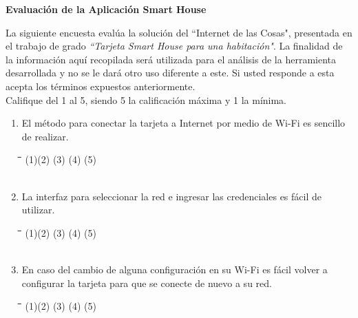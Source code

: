 \documentclass[]{proc}
\begin{document}
	
\textbf{Evaluación de la Aplicación Smart House\\}

La siguiente encuesta evalúa la solución del ``Internet de las Cosas", presentada en el trabajo de grado \textit{``Tarjeta Smart House para una habitación"}. La finalidad de la información aquí recopilada será utilizada para el análisis de la herramienta desarrollada y no se le dará otro uso diferente a este. Si usted responde a esta acepta los términos expuestos anteriormente.\\

Califique del 1 al 5, siendo 5 la calificación máxima y 1 la mínima.\\

\begin{enumerate}
	\item El método para conectar la tarjeta a Internet por medio de Wi-Fi es sencillo de realizar.
	
	\begin{tabbing}
		\hspace{1cm}\=\hspace{1cm}\=\hspace{1cm}\=\hspace{1cm}\=\kill
		(1)\>(2)  \>(3)  \>(4)  \>(5)\\\\
	\end{tabbing}
	
	\item La interfaz para seleccionar la red e ingresar las credenciales es fácil de utilizar. 
	
	\begin{tabbing}
		\hspace{1cm}\=\hspace{1cm}\=\hspace{1cm}\=\hspace{1cm}\=\kill
		(1)\>(2)  \>(3)  \>(4)  \>(5) \\\\
	\end{tabbing} 
	
	\item En caso del cambio de alguna configuración en su Wi-Fi es fácil volver a configurar la tarjeta para que se conecte de nuevo a su red.
	
	\begin{tabbing}
		\hspace{1cm}\=\hspace{1cm}\=\hspace{1cm}\=\hspace{1cm}\=\kill
		(1)\>(2)  \>(3)  \>(4)  \>(5) \\\\
	\end{tabbing} 
	

\end{enumerate}
\end{document}
